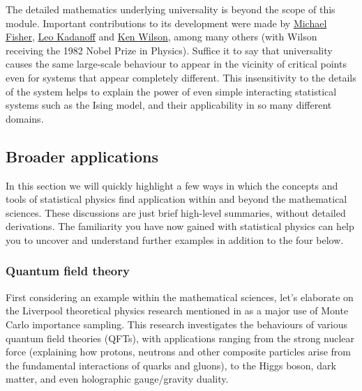 The detailed mathematics underlying universality is beyond the scope of this module.
Important contributions to its development were made by \href{https://en.wikipedia.org/wiki/Michael_Fisher}{Michael Fisher}, \href{https://en.wikipedia.org/wiki/Leo_Kadanoff}{Leo Kadanoff} and \href{https://en.wikipedia.org/wiki/Kenneth_G._Wilson}{Ken Wilson}, among many others (with Wilson receiving the 1982 Nobel Prize in Physics).
Suffice it to say that universality causes the same large-scale behaviour to appear in the vicinity of critical points even for systems that appear completely different.
This insensitivity to the details of the system helps to explain the power of even simple interacting statistical systems such as the Ising model, and their applicability in so many different domains. %



\subsection{\label{sec:broad}Broader applications}
In this section we will quickly highlight a few ways in which the concepts and tools of statistical physics find application within and beyond the mathematical sciences.
These discussions are just brief high-level summaries, without detailed derivations.
The familiarity you have now gained with statistical physics can help you to uncover and understand further examples in addition to the four below.

\subsubsection*{Quantum field theory}
First considering an example within the mathematical sciences, let's elaborate on the Liverpool theoretical physics research mentioned in  as a major use of Monte Carlo importance sampling.
This research investigates the behaviours of various quantum field theories (QFTs), with applications ranging from the strong nuclear force (explaining how protons, neutrons and other composite particles arise from the fundamental interactions of quarks and gluons), to the Higgs boson, dark matter, and even holographic gauge/gravity duality.

